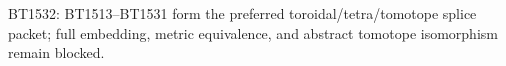 \begin{center}\small
BT1532: BT1513--BT1531 form the preferred toroidal/tetra/tomotope splice packet; full embedding, metric equivalence, and abstract tomotope isomorphism remain blocked.
\end{center}
